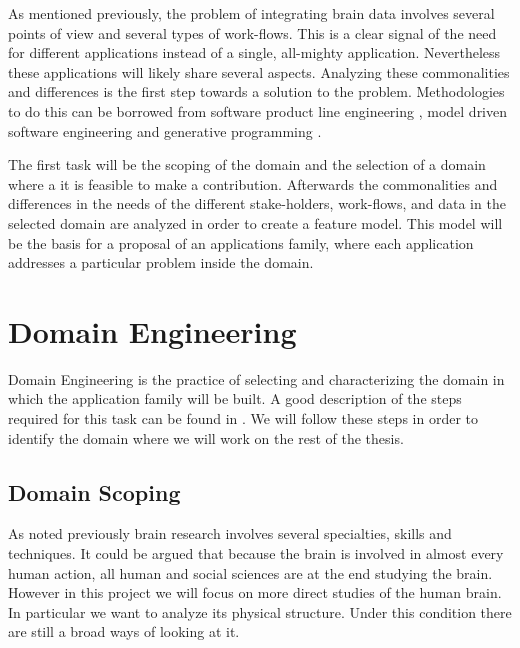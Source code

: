 As mentioned previously, the problem of integrating brain data involves several points of view and several types of work-flows. This is a clear signal of the need for different applications instead of a single, all-mighty application. Nevertheless these applications will likely share several aspects. Analyzing these commonalities and differences is the first step towards a solution to the problem. 
Methodologies to do this can be borrowed from software product line engineering \autocite{pohl_software_2005}, model driven software engineering \autocite{brambilla_model-driven_2012} and generative programming \autocite{czarnecki_generative_2000}. 

The first task will be the scoping of the domain and the selection of a domain where a it is feasible to make a contribution. Afterwards the commonalities and differences in the needs of the different stake-holders, work-flows, and data in the selected domain are analyzed in order to create a feature model. This model will be the basis for a proposal of an applications family, where each application addresses a particular problem inside the domain. 


\section{Domain Engineering}

Domain Engineering is the practice of selecting and characterizing the domain in which the application family will be built. A good description of the steps required for this task can be found in \autocite{czarnecki_generative_2000}. We will follow these steps in order to identify the domain where we will work on the rest of the thesis.

\subsection{Domain Scoping}

As noted previously brain research involves several specialties, skills and techniques. It could be argued that because the brain is involved in almost every human action, all human and social sciences are at the end studying the brain. However in this project we will focus on more direct studies of the human brain. In particular we want to analyze its physical structure. Under this condition there are still a broad ways of looking at it.


